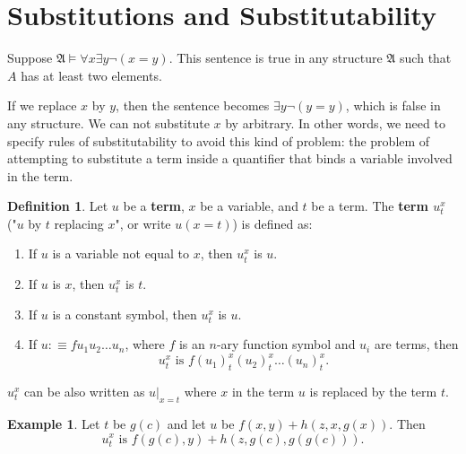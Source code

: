 \documentclass[11pt,letterpaper]{book}
\theoremstyle{definition}
\newtheorem{definition}{Definition}[section]
\newtheorem{example}{Example}[section]
\begin{document}
\section{Substitutions and Substitutability}



Suppose $\mathfrak{A} \models \forall x \exists y \lnot (x= y)$. This
sentence is true in any structure $\mathfrak{A}$ such that $A$ has at
least two elements.

If we replace $x$ by $y$, then the sentence becomes $\exists y \lnot (y
= y)$, which is false in any structure. We can not substitute $x$ by
arbitrary. In other words, we need to specify rules of substitutability
to avoid this kind of problem: the problem of attempting to substitute a
term inside a quantifier that binds a variable involved in the term.




\begin{definition}
Let $u$ be a \textbf{term}, $x$ be a variable, and $t$ be a term. The
\textbf{term $u_t ^{x}$} ("$u$ by $t$ replacing $x$", or write $u(x=t)$)
is defined as:
\begin{enumerate}
\item{If $u$ is a variable not equal to $x$, then $u_t ^{x}$ is $u$.}
\item{If $u$ is $x$, then $u_t ^x$ is $t$.}
\item{If $u$ is a constant symbol, then $u_t ^x$ is $u$.}
\item{If $u:\equiv f u_1 u_2 \ldots u_n$, where $f$ is an $n$-ary
function symbol and $u_i$ are terms, then $$ u_t ^x \mbox{ is } f(u_1)_t
^x (u_2)_t ^x \ldots (u_n)_t ^x . $$}
\end{enumerate}
\end{definition}

$u_t ^x $ can be also written as $u|_{x=t}$ where $x$ in the term $u$ is
replaced by the term $t$.

\begin{example}
Let $t$ be $g(c)$ and let $u$ be $f(x,y) + h(z, x, g(x))$. Then
$$ u_t ^x \mbox{ is } f(g(c), y ) + h(z, g(c), g(g(c))) . $$
\end{example}
\end{document}
